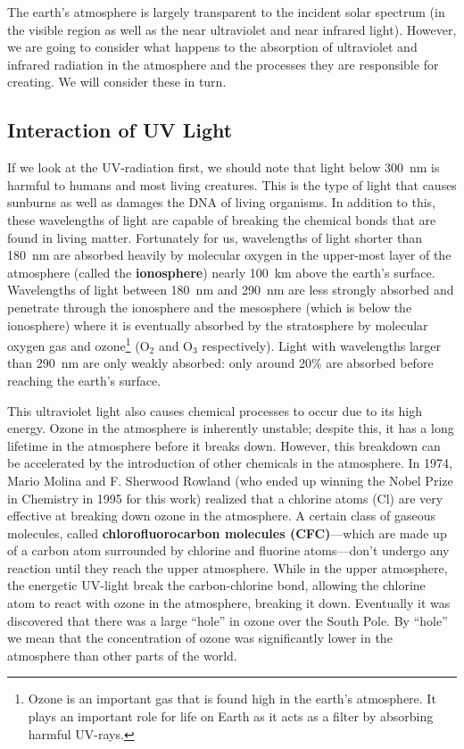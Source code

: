     The earth's atmosphere is largely transparent to the incident solar spectrum (in the visible region as well as the near ultraviolet and near infrared light). However, we are going to consider what happens to the absorption of ultraviolet and infrared radiation in the atmosphere and the processes they are responsible for creating.\cite{schroeder1999introduction,thorndike1976energy} We will consider these in turn.

    \subsection{Interaction of UV Light} %
    \label{sub:uv_light}
    
    If we look at the UV-radiation first, we should note that light below \SI{300}{\nm} is harmful to humans and most living creatures.\cite{thorndike1976energy} This is the type of light that causes sunburns as well as damages the DNA of living organisms. In addition to this, these wavelengths of light are capable of breaking the chemical bonds that are found in living matter. Fortunately for us, wavelengths of light shorter than \SI{180}{\nm} are absorbed heavily by molecular oxygen in the upper-most layer of the atmosphere (called the \textbf{ionosphere}) nearly \SI{100}{km} above the earth's surface.\cite{thorndike1976energy} Wavelengths of light between \SI{180}{\nm} and \SI{290}{\nm} are less strongly absorbed and penetrate through the ionosphere and the mesosphere (which is below the ionosphere) where it is eventually absorbed by the stratosphere by molecular oxygen gas and ozone\footnote{
        Ozone is an important gas that is found high in the earth's atmosphere. It plays an important role for life on Earth as it acts as a filter by absorbing harmful UV-rays.\cite{spiro2012chemistry}
        }
    (O$_2$ and O$_3$ respectively). Light with wavelengths larger than \SI{290}{\nm} are only weakly absorbed: only around 20\% are absorbed before reaching the earth's surface.

    This ultraviolet light also causes chemical processes to occur due to its high energy. Ozone in the atmosphere is inherently unstable; despite this, it has a long lifetime in the atmosphere before it breaks down. However, this breakdown can be accelerated by the introduction of other chemicals in the atmosphere. In 1974, Mario Molina and F. Sherwood Rowland (who ended up winning the Nobel Prize in Chemistry in 1995 for this work) realized that a chlorine atoms (Cl) are very effective at breaking down ozone in the atmosphere. A certain class of gaseous molecules, called \textbf{chlorofluorocarbon molecules (CFC)}---which are made up of a carbon atom surrounded by chlorine and fluorine atoms---don't undergo any reaction until they reach the upper atmosphere. While in the upper atmosphere, the energetic UV-light break the carbon-chlorine bond, allowing the chlorine atom to react with ozone in the atmosphere, breaking it down. Eventually it was discovered that there was a large ``hole'' in ozone over the South Pole. By ``hole'' we mean that the concentration of ozone was significantly lower in the atmosphere than other parts of the world.

